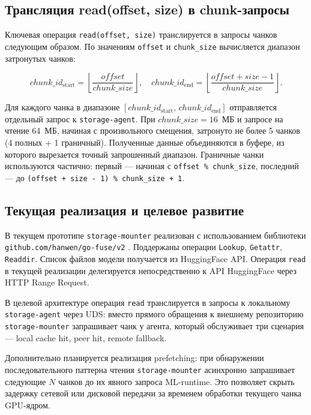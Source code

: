 \subsection*{Трансляция read(offset, size) в chunk-запросы}

Ключевая операция \texttt{read(offset, size)} транслируется в запросы чанков следующим образом. По значениям \texttt{offset} и \texttt{chunk\_size} вычисляется диапазон затронутых чанков:

\begin{equation}
chunk\_id_{\mathrm{start}} = \left\lfloor \frac{offset}{chunk\_size} \right\rfloor, \quad
chunk\_id_{\mathrm{end}} = \left\lfloor \frac{offset + size - 1}{chunk\_size} \right\rfloor.
\label{eq:chunk_range}
\end{equation}

Для каждого чанка в диапазоне $[chunk\_id_{\mathrm{start}},\, chunk\_id_{\mathrm{end}}]$ отправляется отдельный запрос к \texttt{storage-agent}. При $chunk\_size = 16$~МБ и запросе на чтение 64~МБ, начиная с произвольного смещения, затронуто не более 5 чанков (4 полных + 1 граничный). Полученные данные объединяются в буфере, из которого вырезается точный запрошенный диапазон. Граничные чанки используются частично: первый --- начиная с \texttt{offset \% chunk\_size}, последний --- до \texttt{(offset + size - 1) \% chunk\_size + 1}.

\subsection*{Текущая реализация и целевое развитие}

В текущем прототипе \texttt{storage-mounter} реализован с использованием библиотеки \texttt{github.com/hanwen/go-fuse/v2} \cite{gofuse}. Поддержаны операции \texttt{Lookup}, \texttt{Getattr}, \texttt{Readdir}. Список файлов модели получается из HuggingFace API. Операция \texttt{read} в текущей реализации делегируется непосредственно к API HuggingFace через HTTP Range Request.

В целевой архитектуре операция \texttt{read} транслируется в запросы к локальному \texttt{storage-agent} через UDS: вместо прямого обращения к внешнему репозиторию \texttt{storage-mounter} запрашивает чанк у агента, который обслуживает три сценария --- local cache hit, peer hit, remote fallback.

Дополнительно планируется реализация prefetching: при обнаружении последовательного паттерна чтения \texttt{storage-mounter} асинхронно запрашивает следующие $N$ чанков до их явного запроса ML-runtime. Это позволяет скрыть задержку сетевой или дисковой передачи за временем обработки текущего чанка GPU-ядром.

